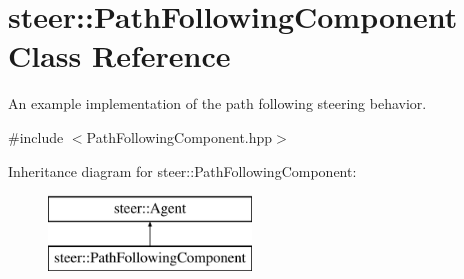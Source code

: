 \hypertarget{classsteer_1_1_path_following_component}{\section{steer\-:\-:Path\-Following\-Component Class Reference}
\label{classsteer_1_1_path_following_component}
}


An example implementation of the path following steering behavior.  




{\ttfamily \#include $<$Path\-Following\-Component.\-hpp$>$}

Inheritance diagram for steer\-:\-:Path\-Following\-Component\-:\begin{figure}[H]
\begin{center}
\leavevmode
\includegraphics[height=2.000000cm]{classsteer_1_1_path_following_component}
\end{center}
\end{figure}
